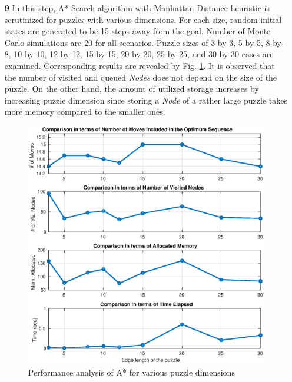 \documentclass[12pt]{article}
\begin{document}
\begin{enumerate}
			
	\item [\textbf{9}]
	In this step, A* Search algorithm with Manhattan Distance heuristic is scrutinized for puzzles with various dimensions. 
	For each size, random initial states are generated to be 15 steps away from the goal. 
	Number of Monte Carlo simulations are 20 for all scenarios.
	Puzzle sizes of 3-by-3, 5-by-5, 8-by-8, 10-by-10, 12-by-12, 15-by-15, 20-by-20, 25-by-25, and 30-by-30 cases are examined.
	Corresponding results are revealed by Fig. \ref{fig:Q9}.
	It is observed that the number of visited and queued \textit{Nodes} does not depend on the size of the puzzle. 
	On the other hand, the amount of utilized storage increases by increasing puzzle dimension since storing a \textit{Node} of a rather large puzzle takes more memory compared to the smaller ones.
	
	\begin{figure}[htb]
		\centering
		\includegraphics[width=0.8\columnwidth]{images/Q9.eps}
		\caption{Performance analysis of A* for various puzzle dimensions}
		\label{fig:Q9}
	\end{figure}

\end{enumerate}

\appendix
 
\end{document}
